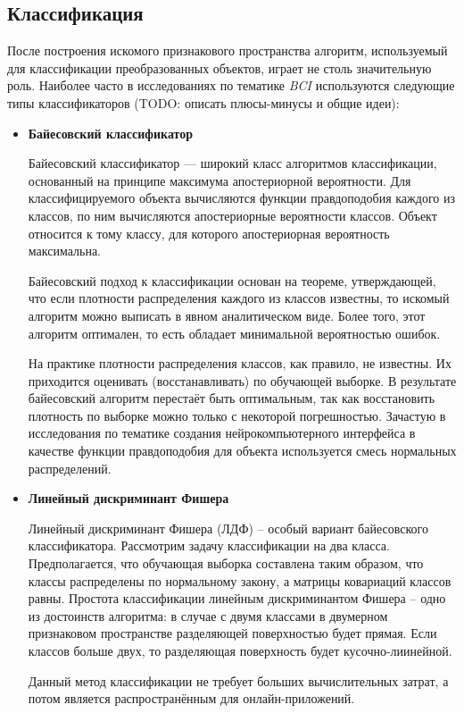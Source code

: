 \documentclass[12pt,fleqn]{article}
\begin{document}
	\subsection{Классификация}
	\par После построения искомого признакового пространства алгоритм, используемый для классификации преобразованных объектов, играет не столь значительную роль. Наиболее часто в исследованиях по тематике {\it BCI} используются следующие типы классификаторов (TODO: описать плюсы-минусы и общие идеи):
	\begin{itemize}
	\item
	{\bf Байесовский классификатор}
	\par Байесовский классификатор — широкий класс алгоритмов классификации, основанный на принципе максимума апостериорной вероятности. Для классифицируемого объекта вычисляются функции правдоподобия каждого из классов, по ним вычисляются апостериорные вероятности классов. Объект относится к тому классу, для которого апостериорная вероятность максимальна.
	\par Байесовский подход к классификации основан на теореме, утверждающей, что если плотности распределения каждого из классов известны, то искомый алгоритм можно выписать в явном аналитическом виде. Более того, этот алгоритм оптимален, то есть обладает минимальной вероятностью ошибок.
	\par На практике плотности распределения классов, как правило, не известны. Их приходится оценивать (восстанавливать) по обучающей выборке. В результате байесовский алгоритм перестаёт быть оптимальным, так как восстановить плотность по выборке можно только с некоторой погрешностью. Зачастую в исследования по тематике создания нейрокомпьютерного интерфейса в качестве функции правдоподобия для объекта используется смесь нормальных распределений.
	\item
	{\bf Линейный дискриминант Фишера}
	\par Линейный дискриминант Фишера (ЛДФ) -- особый вариант байесовского классификатора. Рассмотрим задачу классификации на два класса. Предполагается, что обучающая выборка составлена таким образом, что классы распределены по нормальному закону, а матрицы ковариаций классов равны. Простота классификации линейным дискриминантом Фишера -- одно из достоинств алгоритма: в случае с двумя классами в двумерном признаковом пространстве разделяющей поверхностью будет прямая. Если классов больше двух, то разделяющая поверхность будет кусочно-лиинейной.
	\par Данный метод классификации не требует больших вычислительных затрат, а потом является распространённым для онлайн-приложений.

\end{itemize}
\end{document}
